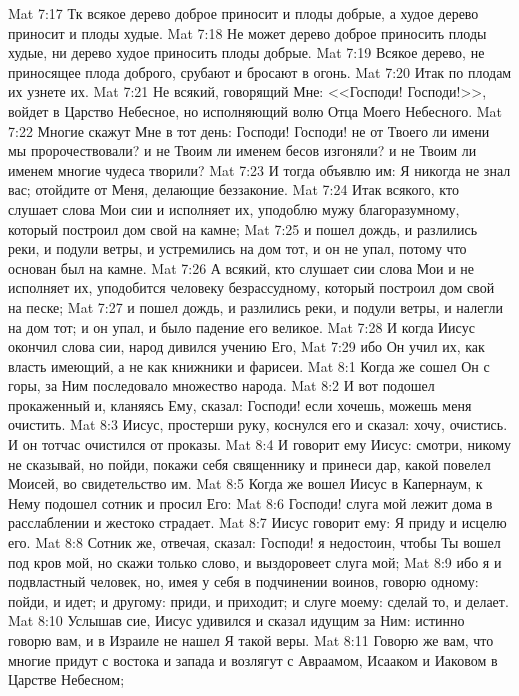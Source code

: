 \vs Mat 7:17 Тк всякое дерево доброе приносит и плоды добрые, а худое дерево приносит и плоды худые.
\vs Mat 7:18 Не может дерево доброе приносить плоды худые, ни дерево худое приносить плоды добрые.
\vs Mat 7:19 Всякое дерево, не приносящее плода доброго, срубают и бросают в огонь.
\vs Mat 7:20 Итак по плодам их узнете их.
\vs Mat 7:21 Не всякий, говорящий Мне: <<Господи! Господи!>>, войдет в Царство Небесное, но исполняющий волю Отца Моего Небесного.
\vs Mat 7:22 Многие скажут Мне в тот день: Господи! Господи! не от Твоего ли имени мы пророчествовали? и не Твоим ли именем бесов изгоняли? и не Твоим ли именем многие чудеса творили?
\vs Mat 7:23 И тогда объявлю им: Я никогда не знал вас; отойдите от Меня, делающие беззаконие.
\rsbpar\vs Mat 7:24 Итак всякого, кто слушает слова Мои сии и исполняет их, уподоблю мужу благоразумному, который построил дом свой на камне;
\vs Mat 7:25 и пошел дождь, и разлились реки, и подули ветры, и устремились на дом тот, и он не упал, потому что основан был на камне.
\vs Mat 7:26 А всякий, кто слушает сии слова Мои и не исполняет их, уподобится человеку безрассудному, который построил дом свой на песке;
\vs Mat 7:27 и пошел дождь, и разлились реки, и подули ветры, и налегли на дом тот; и он упал, и было падение его великое.
\rsbpar\vs Mat 7:28 И когда Иисус окончил слова сии, народ дивился учению Его,
\vs Mat 7:29 ибо Он учил их, как власть имеющий, а не как книжники и фарисеи.
\vs Mat 8:1 Когда же сошел Он с горы, за Ним последовало множество народа.
\vs Mat 8:2 И вот подошел прокаженный и, кланяясь Ему, сказал: Господи! если хочешь, можешь меня очистить.
\vs Mat 8:3 Иисус, простерши руку, коснулся его и сказал: хочу, очистись. И он тотчас очистился от проказы.
\vs Mat 8:4 И говорит ему Иисус: смотри, никому не сказывай, но пойди, покажи себя священнику и принеси дар, какой повелел Моисей, во свидетельство им.
\rsbpar\vs Mat 8:5 Когда же вошел Иисус в Капернаум, к Нему подошел сотник и просил Его:
\vs Mat 8:6 Господи! слуга мой лежит дома в расслаблении и жестоко страдает.
\vs Mat 8:7 Иисус говорит ему: Я приду и исцелю его.
\vs Mat 8:8 Сотник же, отвечая, сказал: Господи! я недостоин, чтобы Ты вошел под кров мой, но скажи только слово, и выздоровеет слуга мой;
\vs Mat 8:9 ибо я и подвластный человек, но, имея у себя в подчинении воинов, говорю одному: пойди, и идет; и другому: приди, и приходит; и слуге моему: сделай то, и делает.
\vs Mat 8:10 Услышав сие, Иисус удивился и сказал идущим за Ним: истинно говорю вам, и в Израиле не нашел Я такой веры.
\vs Mat 8:11 Говорю же вам, что многие придут с востока и запада и возлягут с Авраамом, Исааком и Иаковом в Царстве Небесном;
